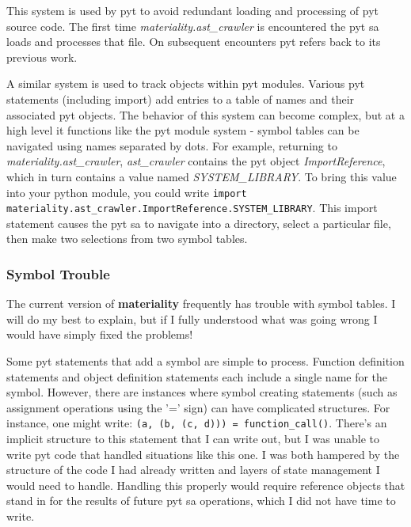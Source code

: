 \documentclass[a4paper,man,natbib,floatsintext]{apa6}
\begin{document}
  This system is used by \Gls{pyt} to avoid redundant loading and processing of \Gls{pyt} source code. The first time \textit{materiality.ast\_crawler} is encountered the \Gls{pyt} \gls{sa} loads and processes that file. On subsequent encounters \Gls{pyt} refers back to its previous work. 

  A similar system is used to track objects within \Gls{pyt} modules. Various \Gls{pyt} statements (including import) add entries to a table of names and their associated \Gls{pyt} objects. The behavior of this system can become complex, but at a high level it functions like the \Gls{pyt} module system - symbol tables can be navigated using names separated by dots. For example, returning to \textit{materiality.ast\_crawler}, \textit{ast\_crawler} contains the \Gls{pyt} object \textit{ImportReference}, which in turn contains a value named \textit{SYSTEM\_LIBRARY}\footnotemark. To bring this value into your python module, you could write \verb|import materiality.ast_crawler.ImportReference.SYSTEM_LIBRARY|. This import statement causes the \Gls{pyt} \gls{sa} to navigate into a directory, select a particular file, then make two selections from two symbol tables. 


  \subsubsection{Symbol Trouble}
  The current version of \textbf{materiality} frequently has trouble with symbol tables. I will do my best to explain, but if I fully understood what was going wrong I would have simply fixed the problems!

  Some \Gls{pyt} statements that add a symbol are simple to process. Function definition statements and object definition statements each include a single name for the symbol. However, there are instances where symbol creating statements (such as assignment operations using the '=' sign) can have complicated structures. For instance, one might write: \verb|(a, (b, (c, d))) = function_call()|. There's an implicit structure to this statement that I can write out\footnotemark, but I was unable to write \Gls{pyt} code that handled situations like this one. I was both hampered by the structure of the code I had already written and layers of state management I would need to handle. Handling this properly would require reference objects that stand in for the results of future \Gls{pyt} \gls{sa} operations, which I did not have time to write.
\end{document}
